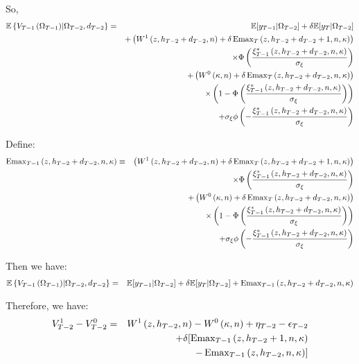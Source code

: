 \noindent So,
\begin{eqnarray*}
\mathbb{E} \left\{ V_{T-1}\left(\Omega_{T-1}\right) \middle| \Omega_{T-2}, d_{T-2}\right\} &=& \mathbb{E} [y_{T-1} | \Omega_{T-2}] + \delta \mathbb{E} [y_T | \Omega_{T-2}] \\
& & + \left( W^1 \left( z, h_{T-2}+ d_{T-2}, n \right) + \delta \operatorname{Emax}_T \left( z, h_{T-2} + d_{T-2} +1, n, \kappa \right) \right) \\
& & \times \Phi \left(\frac{\xi^*_{T-1}\left(z, h_{T-2}+d_{T-2}, n, \kappa \right)}{\sigma_\xi}\right) \\
& & + \left( W^0\left(\kappa, n \right) + \delta \operatorname{Emax}_T \left( z, h_{T-2}+d_{T-2}, n, \kappa \right) \right) \\
& & \times \left( 1 - \Phi \left(\frac{\xi^*_{T-1}\left(z, h_{T-2}+d_{T-2}, n, \kappa \right)}{\sigma_\xi}\right) \right) \\
& & + \sigma_\xi \phi \left(-\frac{\xi^*_{T-1}\left(z, h_{T-2}+d_{T-2}, n, \kappa \right)}{\sigma_\xi}\right)
\end{eqnarray*} 

\noindent Define:
\begin{eqnarray*}
\operatorname{Emax}_{T-1} \left( z, h_{T-2}+d_{T-2}, n, \kappa \right) & \equiv & \left( W^1 \left( z, h_{T-2}+ d_{T-2}, n \right) + \delta \operatorname{Emax}_T \left( z, h_{T-2} + d_{T-2} +1, n, \kappa \right) \right) \\
& & \times \Phi \left(\frac{\xi^*_{T-1}\left(z, h_{T-2}+d_{T-2}, n, \kappa \right)}{\sigma_\xi}\right) \\
& & + \left( W^0\left(\kappa, n \right) + \delta \operatorname{Emax}_T \left( z, h_{T-2}+d_{T-2}, n, \kappa \right) \right) \\
& & \times \left( 1 - \Phi \left(\frac{\xi^*_{T-1}\left(z, h_{T-2}+d_{T-2}, n, \kappa \right)}{\sigma_\xi}\right) \right) \\
& & + \sigma_\xi \phi \left(-\frac{\xi^*_{T-1}\left(z, h_{T-2}+d_{T-2}, n, \kappa \right)}{\sigma_\xi}\right)
\end{eqnarray*}

\noindent Then we have:
\begin{eqnarray*}
\mathbb{E} \left\{ V_{T-1}\left(\Omega_{T-1}\right) \middle| \Omega_{T-2}, d_{T-2}\right\} &=& \mathbb{E} [y_{T-1} | \Omega_{T-2}] + \delta \mathbb{E} [y_T | \Omega_{T-2}] + \operatorname{Emax}_{T-1} \left( z, h_{T-2}+d_{T-2}, n, \kappa \right)
\end{eqnarray*}

\noindent Therefore, we have:
\begin{eqnarray*}
V^1_{T-2} - V^0_{T-2} &=& W^1\left( z, h_{T-2}, n\right) - W^0\left( \kappa, n\right) + \eta_{T-2} - \epsilon_{T-2}\\
& & + \delta [ \operatorname{Emax}_{T-1} \left( z, h_{T-2}+1, n, \kappa \right) \\
& & - \operatorname{Emax}_{T-1} \left(z, h_{T-2}, n, \kappa \right)]
\end{eqnarray*}

